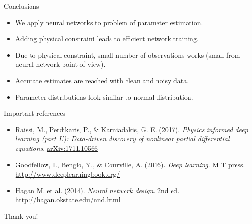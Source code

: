 \documentclass{beamer}
\def\\{}%
\begin{document}

\begin{frame}{Conclusions}
    
\begin{itemize}
    \setlength\itemsep{0.75em}
    \item We apply neural networks to problem of parameter estimation.
    \item Adding physical constraint leads to efficient network training.
    \item Due to physical constraint, small number of observations works (small
          from neural-network point of view).
    \item Accurate estimates are reached with clean and noisy data.
    \item Parameter distributions look similar to normal distribution.
\end{itemize}

\end{frame}


\begin{frame}{Important references}
\begin{itemize}
    \setlength\itemsep{1.5em}
    \item Raissi, M., Perdikaris, P., \& Karniadakis, G. E. (2017). \emph{Physics informed deep learning (part II): Data-driven discovery of nonlinear partial differential equations}.\\
          \href{https://arxiv.org/pdf/1711.10566.pdf}{arXiv:1711.10566}
    \item Goodfellow, I., Bengio, Y., \& Courville, A. (2016). \emph{Deep learning}. MIT press.\\
          \url{http://www.deeplearningbook.org/}
    \item Hagan M. et al. (2014). \emph{Neural network design}. 2nd ed.\\
          \url{http://hagan.okstate.edu/nnd.html}
\end{itemize}
\end{frame}

\begin{frame}[standout]
\Huge
Thank you!
\end{frame}
\end{document}
